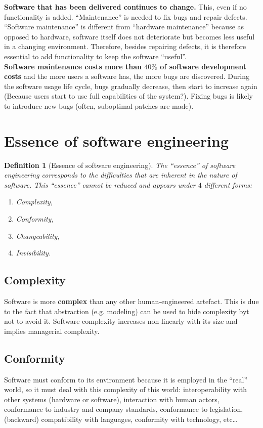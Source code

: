 \documentclass[a4paper,11pt]{report}
\newtheorem{definition}{Definition}
\begin{document}
\textbf{Software that has been delivered continues to change.} This, even if no
functionality is added. ``Maintenance'' is needed to fix bugs and repair
defects. ``Software maintenance'' is different from ``hardware maintenance''
because as opposed to hardware, software itself does not deteriorate but becomes
less useful in a changing environment. Therefore, besides repairing defects, it
is therefore essential to add functionality to keep the software ``useful''.\\

\textbf{Software maintenance costs more than $40\%$ of software development
costs} and the more users a software has, the more bugs are discovered. During
the software usage life cycle, bugs gradually decrease, then start to increase
again (Because users start to use full capabilities of the system?). Fixing bugs
is likely to introduce new bugs (often, suboptimal patches are made).


\section{Essence of software engineering}

\begin{definition}[Essence of software engineering]
The ``essence'' of software engineering corresponds to the difficulties that are
inherent in the nature of software. This ``essence'' cannot be reduced and
appears under $4$ different forms:
\begin{enumerate}
\item Complexity,
\item Conformity,
\item Changeability,
\item Invisibility.
\end{enumerate}
\end{definition}

\subsection{Complexity}
Software is more \textbf{complex} than any other human-engineered artefact.
This is due to the fact that abstraction (e.g. modeling) can be used to hide
complexity byt not to avoid it. Software complexity increases non-linearly with
its size and implies managerial complexity.

\subsection{Conformity}
Software must conform to its environment because it is employed in the ``real''
world, so it must deal with this complexity of this world: interoperability with
other systems (hardware or software), interaction with human actors, conformance
to industry and company standards, conformance to legislation, (backward)
compatibility with languages, conformity with technology, etc\dots
\end{document}
